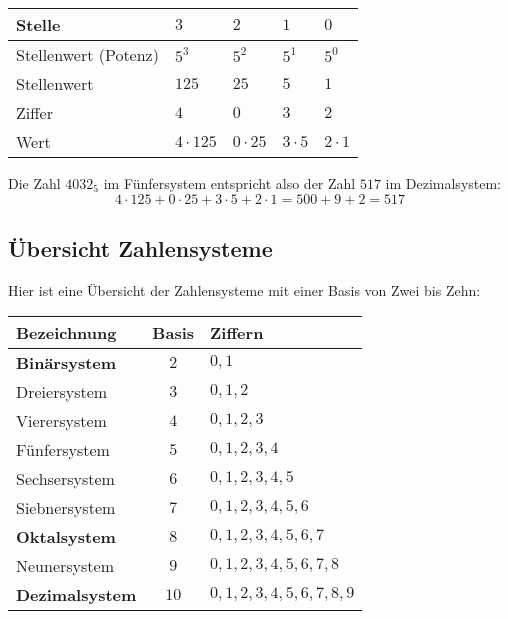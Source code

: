 \begin{center}
  \begin{tabularx}{0.9\textwidth}{lCCCC}
  \toprule
    Stelle & $3$ & $2$ & $1$ & $0$ \\
  \midrule
    Stellenwert (Potenz) & $5^{3}$ & $5^{2}$ & $5^{1}$ & $5^{0}$ \\
  \midrule
    Stellenwert & $125$ & $25$ & $5$ & $1$ \\
  \midrule
    Ziffer & $4$ & $0$ & $3$ & $2$ \\
  \midrule
    Wert & $4\cdot 125$ & $0\cdot 25$ & $3\cdot 5$ & $2\cdot 1$ \\
  \bottomrule
  \end{tabularx}
\end{center}

Die Zahl $4032_5$ im Fünfersystem entspricht also der Zahl $517$ im Dezimalsystem:
\[
  4\cdot 125+0\cdot 25+3\cdot 5+2\cdot 1 = 500+9+2 = 517
\]

\subsection{Übersicht Zahlensysteme}

Hier ist eine Übersicht der Zahlensysteme mit einer Basis von Zwei bis Zehn:

\begin{center}
  \renewcommand{\arraystretch}{1.3}
  \begin{tabularx}{0.7\textwidth}{Xcl}
    \toprule
      \textbf{Bezeichnung}   & \textbf{Basis} & \textbf{Ziffern} \\
    \midrule
      \textbf{Binärsystem}   & $2$     & $0, 1$                      \\
      Dreiersystem           & $3$     & $0, 1, 2$                      \\
      Vierersystem           & $4$     & $0, 1, 2, 3$                   \\
      Fünfersystem           & $5$     & $0, 1, 2, 3, 4$                \\
      Sechsersystem          & $6$     & $0, 1, 2, 3, 4, 5$             \\
      Siebnersystem          & $7$     & $0, 1, 2, 3, 4, 5, 6$          \\
      \textbf{Oktalsystem}   & $8$     & $0, 1, 2, 3, 4, 5, 6, 7$       \\
      Neunersystem           & $9$     & $0, 1, 2, 3, 4, 5, 6, 7, 8$    \\
      \textbf{Dezimalsystem} & $10$    & $0, 1, 2, 3, 4, 5, 6, 7, 8, 9$ \\
    \bottomrule
  \end{tabularx}
\end{center}
